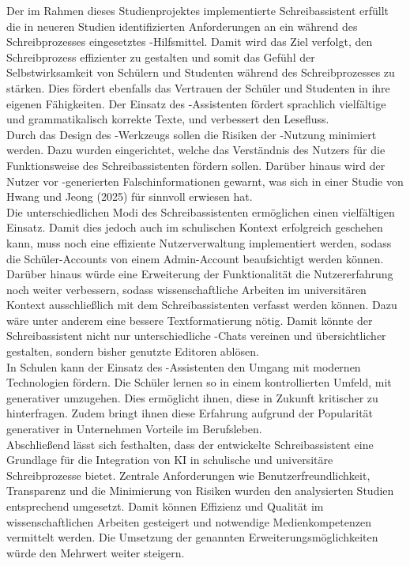 \documentclass[../main.tex]{subfiles}
\begin{document}
Der im Rahmen dieses Studienprojektes implementierte Schreibassistent erfüllt die in neueren Studien identifizierten Anforderungen an ein während des Schreibprozesses eingesetztes 
-Hilfsmittel. Damit wird das Ziel verfolgt, den Schreibprozess effizienter zu gestalten und somit das Gefühl der Selbstwirksamkeit von Schülern und Studenten während des 
Schreibprozesses zu stärken. Dies fördert ebenfalls das Vertrauen der Schüler und Studenten in ihre eigenen Fähigkeiten. Der Einsatz des -Assistenten fördert sprachlich vielfältige 
und grammatikalisch korrekte Texte, und verbessert den Lesefluss. \\
Durch das Design des -Werkzeugs sollen die Risiken der -Nutzung minimiert werden. Dazu wurden  eingerichtet, welche das Verständnis des Nutzers für die Funktionsweise des 
Schreibassistenten fördern sollen. Darüber hinaus wird der Nutzer vor -generierten Falschinformationen gewarnt, was sich in einer Studie von Hwang und Jeong (2025) für sinnvoll 
erwiesen hat. \\
Die unterschiedlichen Modi des Schreibassistenten ermöglichen einen vielfältigen Einsatz. Damit dies jedoch auch im schulischen Kontext erfolgreich geschehen kann, muss noch eine 
effiziente Nutzerverwaltung implementiert werden, sodass die Schüler-Accounts von einem Admin-Account beaufsichtigt werden können.\\
Darüber hinaus würde eine Erweiterung der Funktionalität die Nutzererfahrung noch weiter verbessern, sodass wissenschaftliche Arbeiten im universitären Kontext ausschließlich 
mit dem Schreibassistenten verfasst werden können. Dazu wäre unter anderem eine bessere Textformatierung nötig. Damit könnte der Schreibassistent nicht nur unterschiedliche -Chats vereinen und übersichtlicher gestalten, sondern bisher genutzte 
Editoren ablösen.\\
In Schulen kann der Einsatz des -Assistenten den Umgang mit modernen Technologien fördern. Die Schüler lernen so in einem kontrollierten Umfeld, mit generativer  umzugehen. 
Dies ermöglicht ihnen, diese in Zukunft kritischer zu hinterfragen. Zudem bringt ihnen diese Erfahrung aufgrund der Popularität generativer  in Unternehmen Vorteile im Berufsleben.\\
Abschließend lässt sich festhalten, dass der entwickelte Schreibassistent eine Grundlage für die Integration von KI in schulische und universitäre Schreibprozesse bietet. 
Zentrale Anforderungen wie Benutzerfreundlichkeit, Transparenz und die Minimierung von Risiken wurden den analysierten Studien entsprechend umgesetzt. 
Damit können Effizienz und Qualität im wissenschaftlichen Arbeiten gesteigert und notwendige Medienkompetenzen vermittelt werden. Die Umsetzung der genannten Erweiterungsmöglichkeiten würde 
den Mehrwert weiter steigern. 
\end{document}
